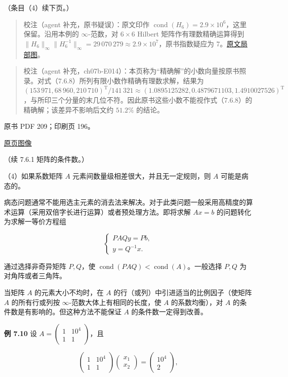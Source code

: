 \documentclass[
  10pt,
  fontset=fandol]{ctexart}
\begin{document}
（条目（4）续下页。）

\begin{quote}
校注（agent 补充，原书疑误）：原文印作
\(\operatorname{cond}(H_6)=2.9\times10^6\)，这里保留。沿用本例的
\(\infty\)-范数，对 \(6\times6\) Hilbert 矩阵作有理数精确运算得到
\(\|H_6\|_\infty\|H_6^{-1}\|_\infty=29\,070\,279\approx2.9\times10^7\)，原书指数疑应为
7。\href{../../../staging/ch07b/assets/208-h6-cond.png}{原文局部图}。
\end{quote}

\begin{quote}
校注（agent
补充，ch07b-E014）：本页称为``精确解''的小数向量按原书照录。对式（7.6.8）所列有限小数作精确有理数求解，结果为
\((153\,971,68\,960,210\,710)^{\mathrm T}/141\,321\approx(1.0895125282,0.4879671103,1.4910027526)^{\mathrm T}\)，与所印三个分量的末几位不符。因此原书这些小数不能视作式（7.6.8）的精确解；该差异不影响后文约
\(51.2\%\) 的结论。
\end{quote}

\clearpage

原书 PDF 209；印刷页 196。

\href{../../../source-images/pdf-209.jpeg}{原页图像}

（续 7.6.1 矩阵的条件数。）

（4）如果系数矩阵 \(A\) 元素间数量级相差很大，并且无一定规则，则 \(A\)
可能是病态的。

病态问题通常不能用选主元素的消去法来解决。对于此类问题一般采用高精度的算术运算（采用双倍字长进行运算）或者预处理方法。即将求解
\(Ax=b\) 的问题转化为求解一等价方程组

\[
\begin{cases}
PAQy=Pb,\\
y=Q^{-1}x.
\end{cases}
\]

通过选择非奇异矩阵 \(P,Q\)，使
\(\operatorname{cond}(PAQ)<\operatorname{cond}(A)\)。一般选择 \(P,Q\)
为对角阵或者三角阵。

当矩阵 \(A\) 的元素大小不均时，在 \(A\)
的行（或列）中引进适当的比例因子（使矩阵 \(A\) 的所有行或列按
\(\infty\)-范数大体上有相同的长度，使 \(A\) 的系数均衡），对 \(A\)
的条件数是有影响的。但这种方法不能保证 \(A\) 的条件数一定得到改善。

\textbf{例 7.10} 设 \(A=\begin{pmatrix}1&10^4\\1&1\end{pmatrix}\)，且

\[
\begin{pmatrix}1&10^4\\1&1\end{pmatrix}
\begin{pmatrix}x_1\\x_2\end{pmatrix}
=\begin{pmatrix}10^4\\2\end{pmatrix},
\tag{7.6.9}
\]
\end{document}
